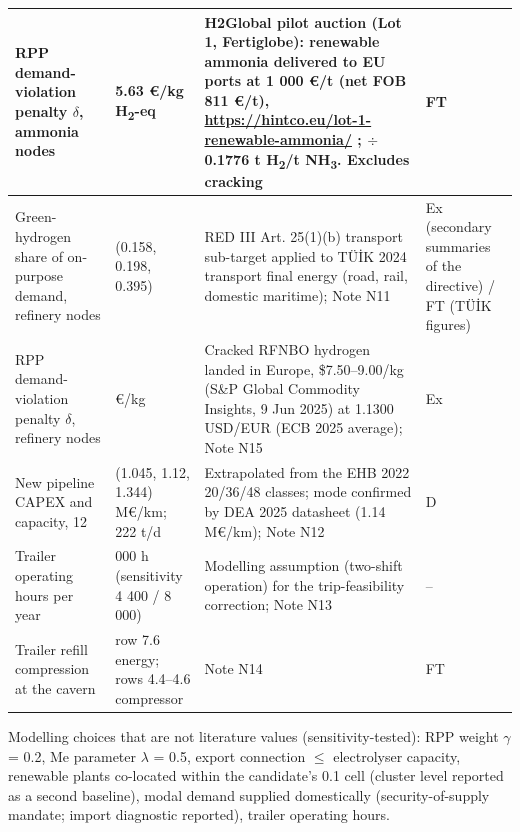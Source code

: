\documentclass[11pt,a4paper]{article}
\begin{document}
\begin{center}\footnotesize
\begin{tabularx}{\textwidth}{>{\hsize=0.638\hsize\raggedright\arraybackslash}X>{\hsize=0.450\hsize\raggedright\arraybackslash}X>{\hsize=2.229\hsize\raggedright\arraybackslash}X>{\hsize=0.683\hsize\raggedright\arraybackslash}X}
\toprule
\textbf{RPP demand-violation penalty $\delta$, ammonia nodes} & \textbf{5.63 \euro{}/\allowbreak{}kg H\textsubscript{2}-eq} & \textbf{H2Global pilot auction (Lot 1, Fertiglobe): renewable ammonia delivered to EU ports at 1 000 \euro{}/\allowbreak{}t (net FOB 811 \euro{}/\allowbreak{}t), \url{https://hintco.eu/lot-1-renewable-ammonia/} ; $\div$ 0.1776 t H\textsubscript{2}/\allowbreak{}t NH\textsubscript{3}. Excludes cracking} & \textbf{FT} \\
\midrule
Green-hydrogen share of on-purpose demand, refinery nodes & (0.158, 0.198, 0.395) & RED III Art. 25(1)(b) transport sub-target applied to TÜİK 2024 transport final energy (road, rail, domestic maritime); Note N11 & Ex (secondary summaries of the directive) /\allowbreak{} FT (TÜİK figures) \\
RPP demand-violation penalty $\delta$, refinery nodes & 7.30 \euro{}/\allowbreak{}kg & Cracked RFNBO hydrogen landed in Europe, \$7.50--9.00/\allowbreak{}kg (S\&P Global Commodity Insights, 9 Jun 2025) at 1.1300 USD/\allowbreak{}EUR (ECB 2025 average); Note N15 & Ex \\
New pipeline CAPEX and capacity, 12\textquotedbl{} & (1.045, 1.12, 1.344) M\euro{}/\allowbreak{}km; 222 t/\allowbreak{}d & Extrapolated from the EHB 2022 20\textquotedbl{}/\allowbreak{}36\textquotedbl{}/\allowbreak{}48\textquotedbl{} classes; mode confirmed by DEA 2025 datasheet (1.14 M\euro{}/\allowbreak{}km); Note N12 & D \\
Trailer operating hours per year & 6 000 h (sensitivity 4 400 /\allowbreak{} 8 000) & Modelling assumption (two-shift operation) for the trip-feasibility correction; Note N13 & -- \\
Trailer refill compression at the cavern & row 7.6 energy; rows 4.4--4.6 compressor & Note N14 & FT \\
\bottomrule
\end{tabularx}
\end{center}

Modelling choices that are not literature values (sensitivity-tested): RPP weight $\gamma$ = 0.2, Me parameter $\lambda$ = 0.5, export connection $\le$ electrolyser capacity, renewable plants co-located within the candidate's 0.1\textdegree{} cell (cluster level reported as a second baseline), modal demand supplied domestically (security-of-supply mandate; import diagnostic reported), trailer operating hours.
\end{document}
